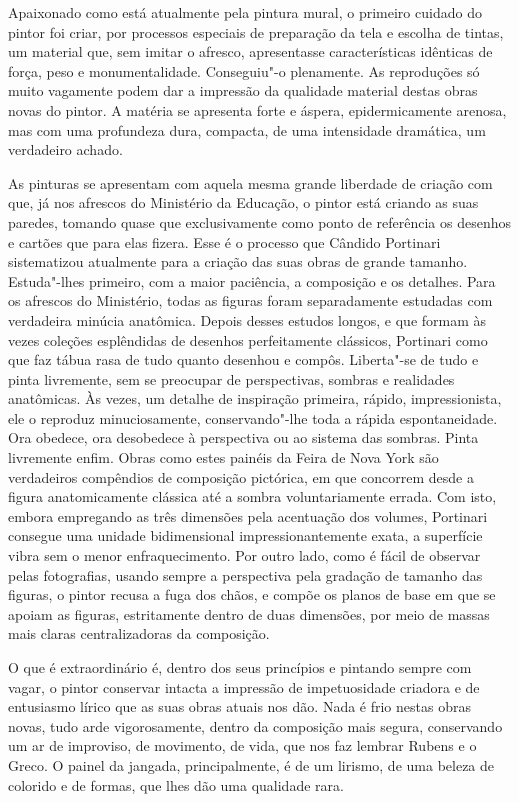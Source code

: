 Apaixonado como está atualmente pela pintura mural, o primeiro cuidado
do pintor foi criar, por processos especiais de preparação da tela e
escolha de tintas, um material que, sem imitar o afresco, apresentasse
características idênticas de força, peso e monumentalidade. Conseguiu"-o
plenamente. As reproduções só muito vagamente podem dar a impressão da
qualidade material destas obras novas do pintor. A matéria se apresenta
forte e áspera, epidermicamente arenosa, mas com uma profundeza dura,
compacta, de uma intensidade dramática, um verdadeiro achado.

As pinturas se apresentam com aquela mesma grande liberdade de criação
com que, já nos afrescos do Ministério da Educação, o pintor está
criando as suas paredes, tomando quase que exclusivamente como ponto de
referência os desenhos e cartões que para elas fizera. Esse é o processo
que Cândido Portinari sistematizou atualmente para a criação das suas
obras de grande tamanho. Estuda"-lhes primeiro, com a maior paciência, a
composição e os detalhes. Para os afrescos do Ministério, todas as
figuras foram separadamente estudadas com verdadeira minúcia anatômica.
Depois desses estudos longos, e que formam às vezes coleções esplêndidas
de desenhos perfeitamente clássicos, Portinari como que faz tábua rasa
de tudo quanto desenhou e compôs. Liberta"-se de tudo e pinta livremente,
sem se preocupar de perspectivas, sombras e realidades anatômicas. Às
vezes, um detalhe de inspiração primeira, rápido, impressionista, ele o
reproduz minuciosamente, conservando"-lhe toda a rápida espontaneidade.
Ora obedece, ora desobedece à perspectiva ou ao sistema das sombras.
Pinta livremente enfim. Obras como estes painéis da Feira de Nova York
são verdadeiros compêndios de composição pictórica, em que concorrem
desde a figura anatomicamente clássica até a sombra voluntariamente
errada. Com isto, embora empregando as três dimensões pela acentuação
dos volumes, Portinari consegue uma unidade bidimensional
impressionantemente exata, a superfície vibra sem o menor
enfraquecimento. Por outro lado, como é fácil de observar pelas
fotografias, usando sempre a perspectiva pela gradação de tamanho das
figuras, o pintor recusa a fuga dos chãos, e compõe os planos de base em
que se apoiam as figuras, estritamente dentro de duas dimensões, por
meio de massas mais claras centralizadoras da composição.

O que é extraordinário é, dentro dos seus princípios e pintando sempre
com vagar, o pintor conservar intacta a impressão de impetuosidade
criadora e de entusiasmo lírico que as suas obras atuais nos dão. Nada é
frio nestas obras novas, tudo arde vigorosamente, dentro da composição
mais segura, conservando um ar de improviso, de movimento, de vida, que
nos faz lembrar Rubens e o Greco. O painel da jangada, principalmente, é
de um lirismo, de uma beleza de colorido e de formas, que lhes dão uma
qualidade rara.

